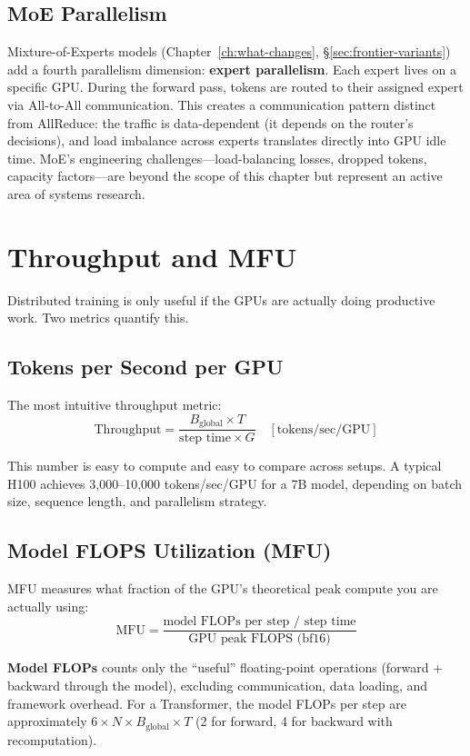 \subsection{MoE Parallelism}

Mixture-of-Experts models (Chapter~\ref{ch:what-changes}, \S\ref{sec:frontier-variants}) add a fourth parallelism dimension: \textbf{expert parallelism}. Each expert lives on a specific GPU. During the forward pass, tokens are routed to their assigned expert via All-to-All communication. This creates a communication pattern distinct from AllReduce: the traffic is data-dependent (it depends on the router's decisions), and load imbalance across experts translates directly into GPU idle time. MoE's engineering challenges---load-balancing losses, dropped tokens, capacity factors---are beyond the scope of this chapter but represent an active area of systems research.


\section{Throughput and MFU}
\label{sec:throughput-mfu}

Distributed training is only useful if the GPUs are actually doing productive work. Two metrics quantify this.

\subsection{Tokens per Second per GPU}

The most intuitive throughput metric:
\[
  \text{Throughput} = \frac{B_{\text{global}} \times T}{\text{step time} \times G} \quad [\text{tokens/sec/GPU}]
\]

This number is easy to compute and easy to compare across setups. A typical H100 achieves 3,000--10,000 tokens/sec/GPU for a 7B model, depending on batch size, sequence length, and parallelism strategy.

\subsection{Model FLOPS Utilization (MFU)}

MFU measures what fraction of the GPU's theoretical peak compute you are actually using:
\[
  \text{MFU} = \frac{\text{model FLOPs per step / step time}}{\text{GPU peak FLOPS (bf16)}}
\]

\textbf{Model FLOPs} counts only the ``useful'' floating-point operations (forward + backward through the model), excluding communication, data loading, and framework overhead. For a Transformer, the model FLOPs per step are approximately $6 \times N \times B_{\text{global}} \times T$ (2 for forward, 4 for backward with recomputation).

